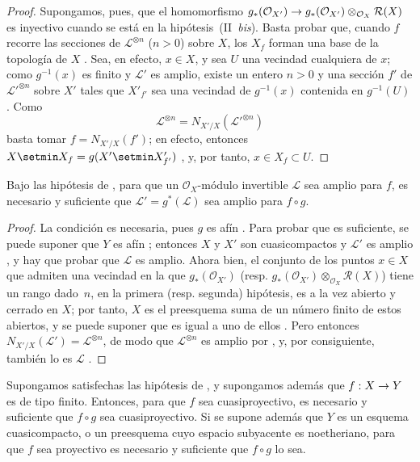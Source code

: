 \documentclass[oneside,10pt]{amsart}
\makeatletter
\newcommand{\ega@arrow}[2]{\mathchoice{#1}{#2}{#2}{#2}}
\renewcommand{\to}{\ega@arrow{\longrightarrow}{\rightarrow}}
\newcommand{\oldpage}[2][]{\marginnote{\normalfont\footnotesize\textbf{#1}~|~#2}\ignorespaces}
\let\EGAOriginalLabel\label
\renewcommand{\label}[1]{\phantomsection\EGAOriginalLabel{#1}}
\makeatother
\begin{document}
\begin{proof}
Supongamos, pues, que el homomorfismo
$g_*(\mathcal{O}_{X'})\to
g_*(\mathcal{O}_{X'})\otimes_{\mathcal{O}_X}\mathcal{R}(X)$
es inyectivo cuando se está en la hipótesis~(II~\emph{bis}).
Basta probar que, cuando $f$ recorre las secciones de $\mathcal{L}^{\otimes n}$ ($n>0$) sobre $X$, los $X_f$ forman una base de la topología de $X$ .
Sea, en efecto, $x\in X$, y sea $U$ una vecindad cualquiera de $x$;
como $g^{-1}(x)$ es finito  y $\mathcal{L}'$ es amplio, existe un entero $n>0$ y una sección $f'$ de ${\mathcal{L}'}^{\otimes n}$ sobre $X'$ tales que $X'_{f'}$ sea una vecindad de $g^{-1}(x)$ contenida en $g^{-1}(U)$ .
Como
\[
\mathcal{L}^{\otimes n}=N_{X'/X}({\mathcal{L}'}^{\otimes n})
\]
basta tomar $f=N_{X'/X}(f')$;
en efecto, entonces
$X\setmin X_f=g(X'\setmin X'_{f'})$
, y, por tanto, $x\in X_f\subset U$.
\end{proof}

\begin{corollary}[6.6.3]
\label{II.6.6.3-fr}
Bajo las hipótesis de , para que un $\mathcal{O}_X$-módulo invertible $\mathcal{L}$ sea amplio para $f$, es necesario y suficiente que $\mathcal{L}'=g^*(\mathcal{L})$ sea amplio para $f\circ g$.
\end{corollary}

\begin{proof}
La condición es necesaria, pues $g$ es afín .
Para probar que es suficiente, se puede suponer que $Y$ es afín ;
entonces $X$ y $X'$ son cuasicompactos y $\mathcal{L}'$ es amplio , y hay que probar que $\mathcal{L}$ es amplio.
\oldpage[II]{132}
Ahora bien, el conjunto de los puntos $x\in X$ que admiten una vecindad en la que $g_*(\mathcal{O}_{X'})$ (resp. $g_*(\mathcal{O}_{X'})\otimes_{\mathcal{O}_X}\mathcal{R}(X)$) tiene un rango dado~$n$, en la primera (resp. segunda) hipótesis, es a la vez abierto y cerrado en $X$;
por tanto, $X$ es el preesquema suma de un número finito de estos abiertos, y se puede suponer que es igual a uno de ellos .
Pero entonces
$N_{X'/X}(\mathcal{L}')=\mathcal{L}^{\otimes n}$,
de modo que $\mathcal{L}^{\otimes n}$ es amplio por , y, por consiguiente, también lo es $\mathcal{L}$ .
\end{proof}

\begin{corollary}[6.6.4]
\label{II.6.6.4-fr}
Supongamos satisfechas las hipótesis de , y supongamos además que $f:X\to Y$ es de tipo finito.
Entonces, para que $f$ sea cuasiproyectivo, es necesario y suficiente que $f\circ g$ sea cuasiproyectivo.
Si se supone además que $Y$ es un esquema cuasicompacto, o un preesquema cuyo espacio subyacente es noetheriano, para que $f$ sea proyectivo es necesario y suficiente que $f\circ g$ lo sea.
\end{corollary}
\end{document}
